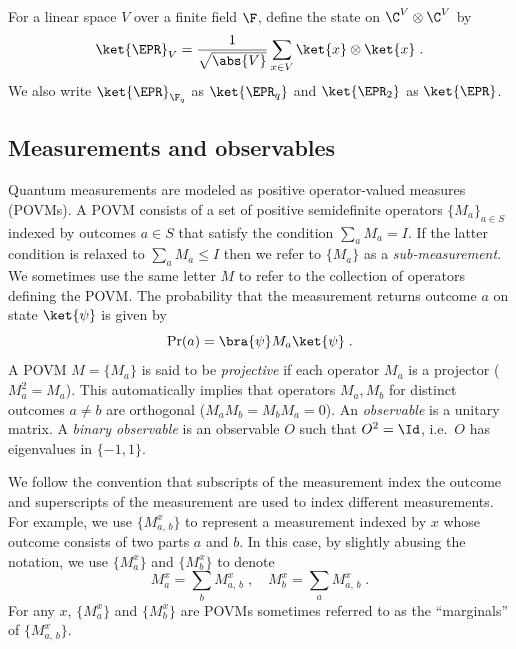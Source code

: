 \begin{definition}
  \label{def:EPR}
  For a linear space $V$ over a finite field $\F$, define the \EPR state on $\C^V
  \otimes \C^V$ by
  \begin{equation*}
    \ket{\EPR}_V = \frac{1}{\sqrt{\abs{V}}} \sum_{x\in V}\ket {x}\otimes \ket{x}\;.
  \end{equation*}
  We also write $\ket{\EPR}_{\F_q}$ as $\ket{\EPR_q}$ and $\ket{\EPR_2}$ as
  $\ket{\EPR}$.
\end{definition}

\subsection{Measurements and observables}

Quantum measurements are modeled as positive operator-valued
measures (POVMs).
A POVM consists of a set of positive semidefinite operators $\{ M_a \}_{a\in S}$
indexed by outcomes $a\in S$ that satisfy the condition $\sum_a M_a = I$. If the latter condition is relaxed to $\sum_a M_a \leq I$ then we refer to $\{M_a\}$ as a \emph{sub-measurement}.
We sometimes use the same letter $M$ to refer to the collection of operators
defining the POVM.
The probability that the measurement returns outcome $a$ on state $\ket{\psi}$
is given by
\begin{equation*}
  \Pr(a) = \bra{\psi} M_a \ket{\psi}\;.
\end{equation*}
A POVM $M=\{M_a\}$ is said to be \emph{projective} if each operator $M_a$ is a
projector ($M_a^2 = M_a$). This automatically implies that operators
$M_a, M_b$ for distinct outcomes $a \neq b$ are orthogonal ($M_a M_b =
M_b M_a = 0$). An \emph{observable} is a unitary matrix.
A \emph{binary observable} is an observable $O$ such that $O^2 = \Id$, i.e.\ $O$
has eigenvalues in $\{-1,1\}$.

We follow the convention that subscripts of the measurement index
the outcome and superscripts of the measurement are used to index different
measurements.
For example, we use $\{M^x_{a,\, b}\}$ to represent a measurement indexed by $x$
whose outcome consists of two parts $a$ and $b$.
In this case, by slightly abusing the notation, we use $\{M^x_a\}$ and $\{M^x_b\}$
to denote
\begin{equation*}
  M^x_a = \sum_b M^x_{a,\, b}\;, \quad M^x_b = \sum_a M^x_{a,\, b}\;.
\end{equation*}
For any $x$, $\{M^x_a\}$ and $\{M^x_b\}$ are POVMs sometimes referred to as the
``marginals'' of $\{M^x_{a,\, b}\}$.

